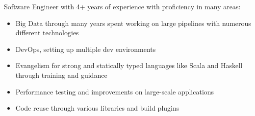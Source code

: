 

\begin{cvparagraph}


Software Engineer with 4+ years of experience with proficiency in many areas:
\begin{itemize}
  \setlength\itemsep{-0.5em}
  \item{Big Data through many years spent working on large pipelines with numerous different technologies}
  \item{DevOps, setting up multiple dev environments}
  \item{Evangelism for strong and statically typed languages like Scala and Haskell through training and guidance}
  \item{Performance testing and improvements on large-scale applications}
  \item{Code reuse through various libraries and build plugins}
\end{itemize}

\end{cvparagraph}
